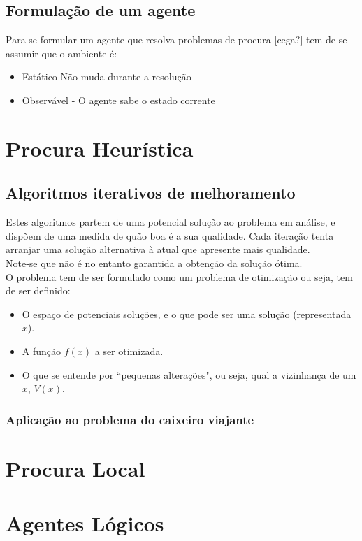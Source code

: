 \documentclass[]{report}
\begin{document}
\section{Formulação de um agente}
Para se formular um agente que resolva problemas de procura [cega?] tem de se assumir que o ambiente é:
\begin{itemize}
\item Estático
Não muda durante a resolução
\item Observável - O agente sabe o estado corrente
\end{itemize}
\chapter{Procura Heurística}
\section{Algoritmos iterativos de melhoramento}
Estes algoritmos partem de uma potencial solução ao problema em análise, e dispõem de uma medida de quão boa é a sua qualidade. Cada iteração tenta arranjar uma solução alternativa à atual que apresente mais qualidade.\\
Note-se que não é no entanto garantida a obtenção da solução ótima.\\[5mm]
O problema tem de ser formulado como um problema de otimização ou seja, tem de ser definido:
\begin{itemize}
\item O espaço de potenciais soluções, e o que pode ser uma solução (representada $x$).
\item A função $f(x)$ a ser otimizada.
\item O que se entende por ``pequenas alterações", ou seja, qual a vizinhança de um $x$, $V(x)$.
\end{itemize}
\subsection{Aplicação ao problema do caixeiro viajante}
\chapter{Procura Local}
\chapter{Agentes Lógicos}
\end{document}
